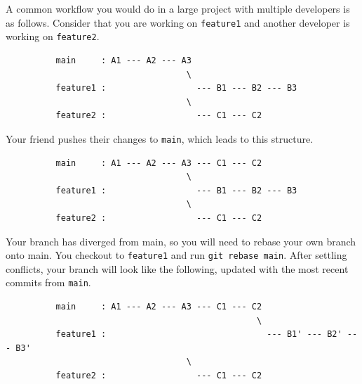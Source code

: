 \documentclass{article}
\begin{document}
      \begin{example}
        A common workflow you would do in a large project with multiple developers is as follows. Consider that you are working on \texttt{feature1} and another developer is working on \texttt{feature2}. 
        \begin{lstlisting}
          main     : A1 --- A2 --- A3
                                    \
          feature1 :                  --- B1 --- B2 --- B3
                                    \
          feature2 :                  --- C1 --- C2 
        \end{lstlisting}
        Your friend pushes their changes to \texttt{main}, which leads to this structure. 
        \begin{lstlisting}
          main     : A1 --- A2 --- A3 --- C1 --- C2
                                    \
          feature1 :                  --- B1 --- B2 --- B3
                                    \
          feature2 :                  --- C1 --- C2 
        \end{lstlisting}
        Your branch has diverged from main, so you will need to rebase your own branch onto main. You checkout to \texttt{feature1} and run \texttt{git rebase main}. After settling conflicts, your branch will look like the following, updated with the most recent commits from \texttt{main}. 
        \begin{lstlisting}
          main     : A1 --- A2 --- A3 --- C1 --- C2
                                                  \
          feature1 :                                --- B1' --- B2' --- B3'
                                    \
          feature2 :                  --- C1 --- C2 
        \end{lstlisting}
      \end{example}
\end{document}
